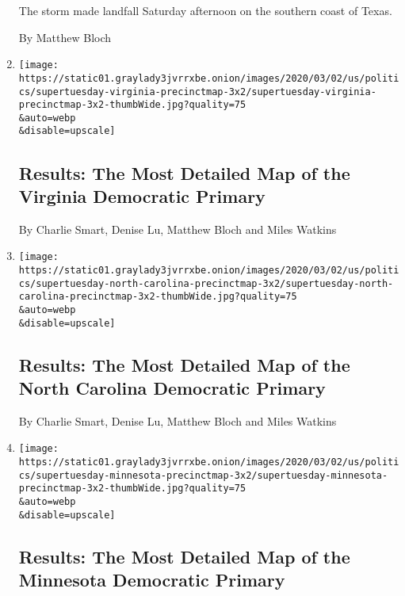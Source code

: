 \begin{enumerate}
  The storm made landfall Saturday afternoon on the southern coast of
  Texas.

  By Matthew Bloch
\item
  \href{/interactive/2020/03/03/us/elections/precinct-map-virginia-primary.html}{}

  \texttt{[image: https://static01.graylady3jvrrxbe.onion/images/2020/03/02/us/politics/supertuesday-virginia-precinctmap-3x2/supertuesday-virginia-precinctmap-3x2-thumbWide.jpg?quality=75\\\&auto=webp\\\&disable=upscale]}

  \hypertarget{results-the-most-detailed-map-of-the-virginia-democratic-primary}{%
  \subsection{Results: The Most Detailed Map of the Virginia Democratic
  Primary}\label{results-the-most-detailed-map-of-the-virginia-democratic-primary}}

  By Charlie Smart, Denise Lu, Matthew Bloch and Miles Watkins
\item
  \href{/interactive/2020/03/03/us/elections/precinct-map-north-carolina-primary.html}{}

  \texttt{[image: https://static01.graylady3jvrrxbe.onion/images/2020/03/02/us/politics/supertuesday-north-carolina-precinctmap-3x2/supertuesday-north-carolina-precinctmap-3x2-thumbWide.jpg?quality=75\\\&auto=webp\\\&disable=upscale]}

  \hypertarget{results-the-most-detailed-map-of-the-north-carolina-democratic-primary}{%
  \subsection{Results: The Most Detailed Map of the North Carolina
  Democratic
  Primary}\label{results-the-most-detailed-map-of-the-north-carolina-democratic-primary}}

  By Charlie Smart, Denise Lu, Matthew Bloch and Miles Watkins
\item
  \href{/interactive/2020/03/03/us/elections/precinct-map-minnesota-primary.html}{}

  \texttt{[image: https://static01.graylady3jvrrxbe.onion/images/2020/03/02/us/politics/supertuesday-minnesota-precinctmap-3x2/supertuesday-minnesota-precinctmap-3x2-thumbWide.jpg?quality=75\\\&auto=webp\\\&disable=upscale]}

  \hypertarget{results-the-most-detailed-map-of-the-minnesota-democratic-primary}{%
  \subsection{Results: The Most Detailed Map of the Minnesota Democratic
  Primary}\label{results-the-most-detailed-map-of-the-minnesota-democratic-primary}}


\end{enumerate}
